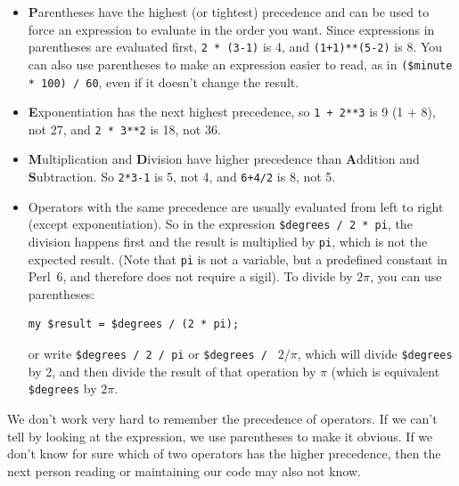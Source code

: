 \begin{itemize}

\item {\bf P}arentheses have the highest (or tightest) precedence and can be used 
to force an expression to evaluate in the order you want. Since
expressions in parentheses are evaluated first, {\tt 2 * (3-1)} is 4,
and {\tt (1+1)**(5-2)} is 8. You can also use parentheses to make an
expression easier to read, as in {\tt (\$minute * 100) / 60}, even
if it doesn't change the result.

\item {\bf E}xponentiation has the next highest precedence, so
{\tt 1 + 2**3} is 9 (1 + 8), not 27, and {\tt 2 * 3**2} is 18, not 36.

\item {\bf M}ultiplication and {\bf D}ivision have higher precedence
  than {\bf A}ddition and {\bf S}ubtraction.  So {\tt 2*3-1} is 5, not
  4, and {\tt 6+4/2} is 8, not 5.

\item Operators with the same precedence are usually evaluated 
from left to right (except exponentiation).  So in the expression 
{\tt \$degrees / 2 * pi}, the division happens first and the 
result is multiplied by {\tt pi}, which is not the expected 
result. (Note that {\tt pi} is not a variable, but a predefined 
constant in Perl~6, and therefore does not require a sigil).  To 
divide by $2 \pi$, you can use parentheses:
  
\begin{verbatim}
my $result = $degrees / (2 * pi);  
\end{verbatim}  
 
or write
  {\tt \$degrees / 2 / pi} or {\tt \$degrees / } $2 / \pi$, which 
  will divide \verb'$degrees' by 2, and then divide the result of 
  that operation by $\pi$ (which is equivalent \verb'$degrees' by 
   $2 \pi$.

\end{itemize}

We don't work very hard to remember the precedence of
operators.  If we can't tell by looking at the expression, we use
parentheses to make it obvious. If we don't know for sure which of two operators 
has the higher precedence, then the next person reading or maintaining 
our code may also not know.


